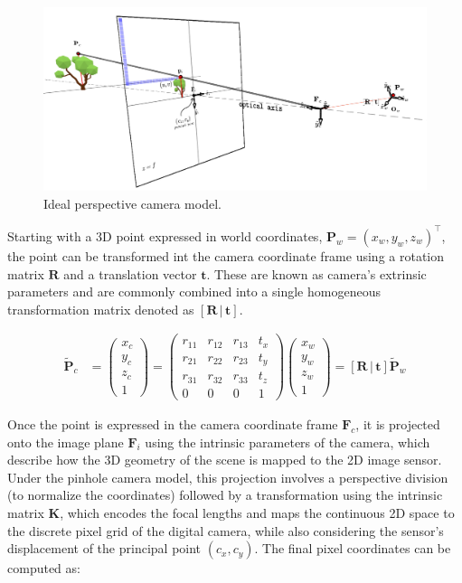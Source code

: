 \begin{figure}[h!]
    \centering
    \includegraphics[width=0.5\linewidth]{images/methodology/pinhole_model/pinhole_model_2.png}
    \caption{Ideal perspective camera model.}
    \label{fig:pinhole_model}
\end{figure}

Starting with a 3D point expressed in world coordinates, $\mathbf{P}_w = \left(x_w, y_w, z_w\right)^\top$, the point can be transformed int the camera coordinate frame using a rotation matrix $\mathbf{R}$ and a translation vector $\mathbf{t}$. These are known as camera's extrinsic parameters and are commonly combined into a single homogeneous transformation matrix denoted as $\left[\mathbf{R} \,|\, \mathbf{t}\right]$.

\begin{align}
    \tilde{\mathbf{P}}_c 
    &=
    \begin{pmatrix}
        x_c \\
        y_c \\
        z_c \\
        1
    \end{pmatrix}
    =
    \begin{pmatrix}
        r_{11} & r_{12} & r_{13} & t_x \\
        r_{21} & r_{22} & r_{23} & t_y \\
        r_{31} & r_{32} & r_{33} & t_z \\
        0 & 0 & 0 & 1
    \end{pmatrix}
    \begin{pmatrix}
        x_w \\
        y_w \\
        z_w \\
        1
    \end{pmatrix}
    =
    \left[ \mathbf{R} \,|\, \mathbf{t} \right] \tilde{\mathbf{P}}_w 
\end{align}

Once the point is expressed in the camera coordinate frame $\mathbf{F}_c$, it is projected onto the image plane $\mathbf{F}_i$ using the intrinsic parameters of the camera, which describe how the 3D geometry of the scene is mapped to the 2D image sensor. Under the pinhole camera model, this projection involves a perspective division (to normalize the coordinates) followed by a transformation using the intrinsic matrix $\mathbf{K}$, which encodes the focal lengths and maps the continuous 2D space to the discrete pixel grid of the digital camera, while also considering the sensor's displacement of the principal point $(c_x, c_y)$. The final pixel coordinates can be computed as:

